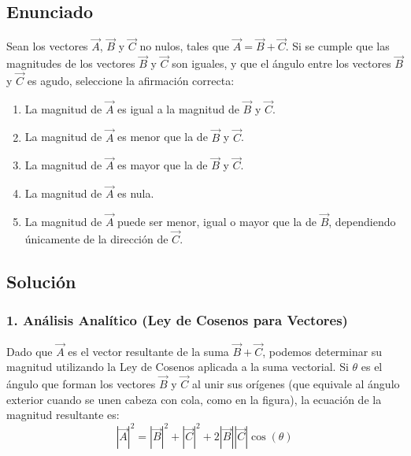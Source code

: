 \documentclass[12pt, a4paper]{article}
\begin{document}
\newpage

\subsection*{Enunciado}
Sean los vectores $\vec{A}$, $\vec{B}$ y $\vec{C}$ no nulos, tales que $\vec{A} = \vec{B} + \vec{C}$. Si se cumple que las magnitudes de los vectores $\vec{B}$ y $\vec{C}$ son iguales, y que el ángulo entre los vectores $\vec{B}$ y $\vec{C}$ es agudo, seleccione la afirmación correcta:

\begin{enumerate}[label=\alph*)]
    \item La magnitud de $\vec{A}$ es igual a la magnitud de $\vec{B}$ y $\vec{C}$.
    \item La magnitud de $\vec{A}$ es menor que la de $\vec{B}$ y $\vec{C}$.
    \item La magnitud de $\vec{A}$ es mayor que la de $\vec{B}$ y $\vec{C}$.
    \item La magnitud de $\vec{A}$ es nula.
    \item La magnitud de $\vec{A}$ puede ser menor, igual o mayor que la de $\vec{B}$, dependiendo únicamente de la dirección de $\vec{C}$.
\end{enumerate}

\begin{center}
\end{center}

\subsection*{Solución}

\subsubsection*{1. Análisis Analítico (Ley de Cosenos para Vectores)}
Dado que $\vec{A}$ es el vector resultante de la suma $\vec{B} + \vec{C}$, podemos determinar su magnitud utilizando la Ley de Cosenos aplicada a la suma vectorial. Si $\theta$ es el ángulo que forman los vectores $\vec{B}$ y $\vec{C}$ al unir sus orígenes (que equivale al ángulo exterior cuando se unen cabeza con cola, como en la figura), la ecuación de la magnitud resultante es:
$$|\vec{A}|^2 = |\vec{B}|^2 + |\vec{C}|^2 + 2|\vec{B}||\vec{C}|\cos(\theta)$$
\end{document}
